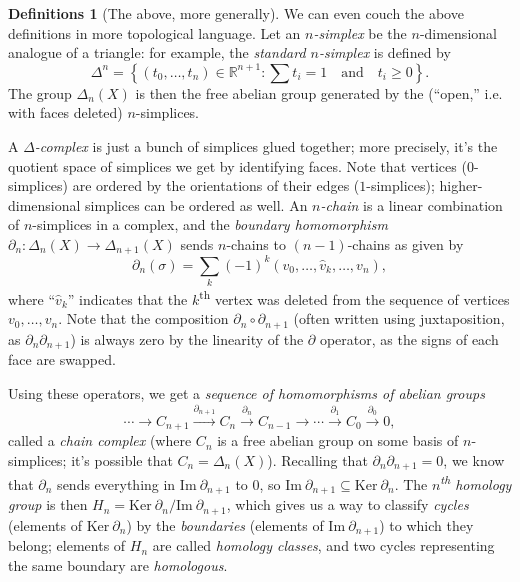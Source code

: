\documentclass[11pt]{article}
\theoremstyle{definition}
\newtheorem*{definitions*}{Definitions}
\newcommand{\R}{\mathbb{R}}			%
\newcommand{\Kernel}[1]{\mathrm{Ker}\ #1}		%
\newcommand{\Image}[1]{\mathrm{Im}\ #1}			%
\begin{document}
		\begin{definitions*}[The above, more generally]
			We can even couch the above definitions in more topological language. Let an \textit{$n$-simplex} be the $n$-dimensional analogue of a triangle: for example, the \textit{standard $n$-simplex} is defined by $$\Delta^n = \left\{(t_0, \dots, t_n) \in \R^{n+1} : \sum t_i = 1 \hspace{1em} \text{and} \hspace{1em} t_i \geq 0\right\}. $$ The group $\Delta_n(X)$ is then the free abelian group generated by the (``open,'' i.e. with faces deleted) $n$-simplices.
			
			A \textit{$\Delta$-complex} is just a bunch of simplices glued together; more precisely, it's the quotient space of simplices we get by identifying faces. Note that vertices ($0$-simplices) are ordered by the orientations of their edges ($1$-simplices); higher-dimensional simplices can be ordered as well. An \textit{$n$-chain} is a linear combination of $n$-simplices in a complex, and the \textit{boundary homomorphism} $\partial_n : \Delta_n(X) \to \Delta_{n+1}(X)$ sends $n$-chains to $(n-1)$-chains as given by $$ \partial_n(\sigma) = \sum_{k} (-1)^k (v_0, \dots, \hat v_k, \dots, v_n), $$ where ``$\hat v_k$'' indicates that the $k$\textsuperscript{th} vertex was deleted from the sequence of vertices $v_0, \dots, v_n$. Note that the composition $\partial_n \circ \partial_{n+1}$ (often written using juxtaposition, as $\partial_n\partial_{n+1}$) is always zero by the linearity of the $\partial$ operator, as the signs of each face are swapped.
			
			Using these operators, we get a \textit{sequence of homomorphisms of abelian groups} $$ \cdots \longrightarrow C_{n+1} \overset{\partial_{n+1}}{\longrightarrow} C_n \overset{\partial_n}{\longrightarrow} C_{n-1} \longrightarrow \cdots \overset{\partial_1}{\longrightarrow} C_0 \overset{\partial_0}{\longrightarrow} 0, $$ called a \textit{chain complex} (where $C_n$ is a free abelian group on some basis of $n$-simplices; it's possible that $C_n = \Delta_n(X)$). Recalling that $\partial_n\partial_{n+1} = 0$, we know that $\partial_{n}$ sends everything in $\Image \partial_{n+1}$ to $0$, so $\Image \partial_{n+1} \subseteq \Kernel \partial_n$. The \textit{$n$\textsuperscript{th} homology group} is then $H_n = \Kernel \partial_n / \Image \partial_{n+1}$, which gives us a way to classify \textit{cycles} (elements of $\Kernel \partial_n$) by the \textit{boundaries} (elements of $\Image \partial_{n+1}$) to which they belong; elements of $H_n$ are called \textit{homology classes}, and two cycles representing the same boundary are \textit{homologous}.
			

\end{definitions*}
\end{document}
